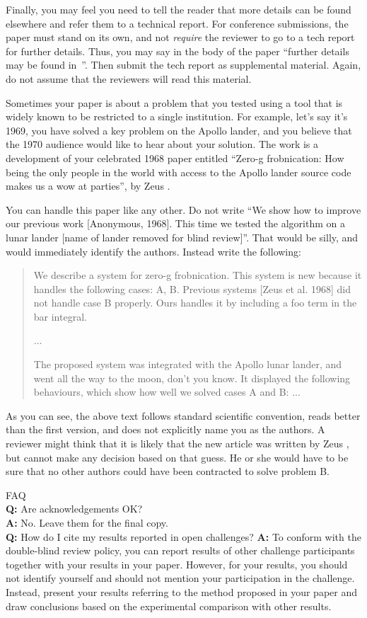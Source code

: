 Finally, you may feel you need to tell the reader that more details can be found elsewhere and refer them to a technical report.
For conference submissions, the paper must stand on its own, and not {\em require} the reviewer to go to a tech report for further details.
Thus, you may say in the body of the paper ``further details may be found in~\cite{Authors14b}''.
Then submit the tech report as supplemental material.
Again, do not assume that the reviewers will read this material.

Sometimes your paper is about a problem that you tested using a tool that is widely known to be restricted to a single institution.
For example, let's say it's 1969, you have solved a key problem on the Apollo lander, and you believe that the 1970 audience would like to hear about your
solution.
The work is a development of your celebrated 1968 paper entitled ``Zero-g frobnication: How being the only people in the world with access to the Apollo lander source code makes us a wow at parties'', by Zeus \etal.

You can handle this paper like any other.
Do not write ``We show how to improve our previous work [Anonymous, 1968].
This time we tested the algorithm on a lunar lander [name of lander removed for blind review]''.
That would be silly, and would immediately identify the authors.
Instead write the following:
\begin{quotation}
\noindent
   We describe a system for zero-g frobnication.
   This system is new because it handles the following cases:
   A, B.  Previous systems [Zeus et al. 1968] did not  handle case B properly.
   Ours handles it by including a foo term in the bar integral.

   ...

   The proposed system was integrated with the Apollo lunar lander, and went all the way to the moon, don't you know.
   It displayed the following behaviours, which show how well we solved cases A and B: ...
\end{quotation}
As you can see, the above text follows standard scientific convention, reads better than the first version, and does not explicitly name you as the authors.
A reviewer might think that it is likely that the new article was written by Zeus \etal, but cannot make any decision based on that guess.
He or she would have to be sure that no other authors could have been contracted to solve problem B.
\medskip

\noindent
FAQ\medskip\\
{\bf Q:} Are acknowledgements OK?\\
{\bf A:} No.  Leave them for the final copy.\medskip\\
{\bf Q:} How do I cite my results reported in open challenges?
{\bf A:} To conform with the double-blind review policy, you can report results of other challenge participants together with your results in your paper.
However, for your results, you should not identify yourself and should not mention your participation in the challenge.
Instead, present your results referring to the method proposed in your paper and draw conclusions based on the experimental comparison with other results.\medskip\\


